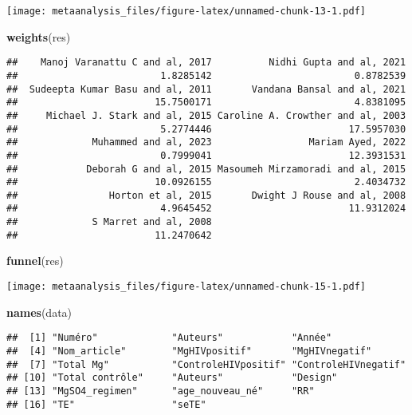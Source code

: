 \documentclass[
]{article}
\newenvironment{Shaded}{\begin{snugshade}}{\end{snugshade}}
\newcommand{\FunctionTok}[1]{\textcolor[rgb]{0.13,0.29,0.53}{\textbf{#1}}}
\newcommand{\NormalTok}[1]{#1}
\begin{document}
\texttt{[image: metaanalysis\_files/figure-latex/unnamed-chunk-13-1.pdf]}

\begin{Shaded}
\begin{Highlighting}[]
\FunctionTok{weights}\NormalTok{(res)}
\end{Highlighting}
\end{Shaded}

\begin{verbatim}
##    Manoj Varanattu C and al, 2017          Nidhi Gupta and al, 2021 
##                         1.8285142                         0.8782539 
##  Sudeepta Kumar Basu and al, 2011       Vandana Bansal and al, 2021 
##                        15.7500171                         4.8381095 
##     Michael J. Stark and al, 2015 Caroline A. Crowther and al, 2003 
##                         5.2774446                        17.5957030 
##             Muhammed and al, 2023                 Mariam Ayed, 2022 
##                         0.7999041                        12.3931531 
##            Deborah G and al, 2015 Masoumeh Mirzamoradi and al, 2015 
##                        10.0926155                         2.4034732 
##                Horton et al, 2015       Dwight J Rouse and al, 2008 
##                         4.9645452                        11.9312024 
##             S Marret and al, 2008 
##                        11.2470642
\end{verbatim}

\begin{Shaded}
\begin{Highlighting}[]
\FunctionTok{funnel}\NormalTok{(res)}
\end{Highlighting}
\end{Shaded}

\texttt{[image: metaanalysis\_files/figure-latex/unnamed-chunk-15-1.pdf]}

\begin{Shaded}
\begin{Highlighting}[]
\FunctionTok{names}\NormalTok{(data)}
\end{Highlighting}
\end{Shaded}

\begin{verbatim}
##  [1] "Numéro"             "Auteurs"            "Année"             
##  [4] "Nom_article"        "MgHIVpositif"       "MgHIVnegatif"      
##  [7] "Total Mg"           "ControleHIVpositif" "ControleHIVnegatif"
## [10] "Total contrôle"     "Auteurs"            "Design"            
## [13] "MgSO4_regimen"      "age_nouveau_né"     "RR"                
## [16] "TE"                 "seTE"
\end{verbatim}
\end{document}
